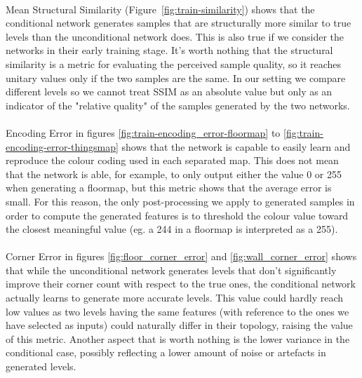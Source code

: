 \paragraph{} Mean Structural Similarity (Figure~\ref{fig:train-similarity}) shows that the conditional network generates samples that are structurally more similar to true levels than the unconditional network does. This is also true if we consider the networks in their early training stage. It's worth nothing that the structural similarity is a metric for evaluating the perceived sample quality, so it reaches unitary values only if the two samples are the same. In our setting we compare different levels so we cannot treat SSIM as an absolute value but only as an indicator of the "relative quality" of the samples generated by the two networks.

\paragraph{} Encoding Error in figures \ref{fig:train-encoding_error-floormap} to \ref{fig:train-encoding-error-thingsmap} shows that the network is capable to easily learn and reproduce the colour coding used in each separated map. This does not mean that the network is able, for example, to only output either the value 0 or 255 when generating a floormap, but this metric shows that the average error is small. For this reason, the only post-processing we apply to generated samples in order to compute the generated features is to threshold the colour value toward the closest meaningful value (eg. a 244 in a floormap is interpreted as a 255). 

\paragraph{} Corner Error in figures \ref{fig:floor_corner_error} and \ref{fig:wall_corner_error} shows that while the unconditional network generates levels that don't significantly improve their corner count with respect to the true ones, the conditional network actually learns to generate more accurate levels. This value could hardly reach low values as two levels having the same features (with reference to the ones we have selected as inputs) could naturally differ in their topology, raising the value of this metric. Another aspect that is worth nothing is the lower variance in the conditional case, possibly reflecting a lower amount of noise or artefacts in generated levels.

\clearpage


